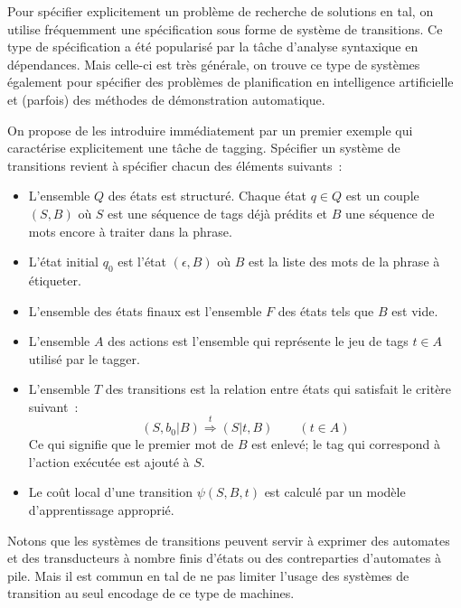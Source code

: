 \documentclass[11pt,openany]{book}
\newcommand{\ac}[1]{{\sc #1}} %
\begin{document}
Pour spécifier explicitement un problème de recherche de solutions en \ac{tal}, on utilise fréquemment une spécification sous forme de système de transitions. Ce type de spécification a été popularisé par la tâche d'analyse syntaxique en dépendances.  Mais celle-ci est très générale, on trouve ce type de systèmes également pour spécifier des problèmes de planification en intelligence artificielle et (parfois) des méthodes de démonstration automatique. 

On propose de les introduire immédiatement par un premier exemple qui caractérise explicitement une tâche de tagging. Spécifier un système de transitions revient à spécifier chacun des éléments suivants~:
\begin{itemize}
\item L'ensemble $Q$ des états est structuré. Chaque état $q\in Q$ est un couple $(S,B)$ où $S$ est une séquence de tags déjà prédits et $B$ une séquence de mots encore à traiter dans la phrase. 
\item L'état initial $q_0$ est l'état $(\epsilon , B)$ où $B$ est la liste des mots de la phrase à étiqueter.
\item L'ensemble des états finaux est l'ensemble $F$ des états tels que $B$ est vide. 
\item L'ensemble $A$ des actions est l'ensemble qui représente le jeu de tags $t\in A$ utilisé par le tagger.
\item L'ensemble $T$ des transitions est la relation
entre états qui satisfait le critère suivant~: 
\begin{displaymath}
(S,b_0|B) \stackrel{t}{\Rightarrow}(S|t,B)\qquad (t \in A)
\end{displaymath}
Ce qui signifie que le premier mot de $B$ est enlevé; le tag qui correspond à l'action exécutée est ajouté à $S$.
\item Le coût local d'une transition $\psi(S,B,t)$ est calculé par un modèle d'apprentissage approprié. 
\end{itemize}

Notons que les systèmes de transitions peuvent servir à exprimer des automates et des transducteurs à nombre finis d'états ou des contreparties d'automates à pile. Mais il est commun en \ac{tal} de ne pas limiter l'usage des systèmes de transition au seul encodage de ce type de machines.
\end{document}
